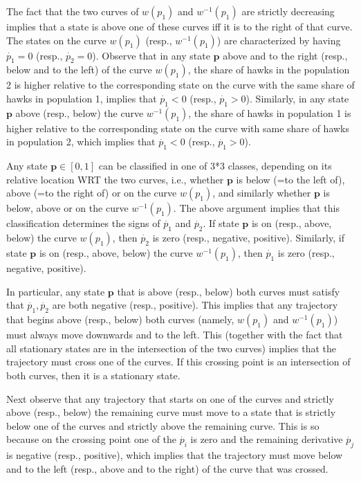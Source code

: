 \documentclass[12pt]{article}
\numberwithin{equation}{section}
\numberwithin{figure}{section}
\theoremstyle{definition}
\theoremstyle{plain}
\theoremstyle{plain}
\theoremstyle{plain}
\theoremstyle{remark}
\theoremstyle{plain}
\theoremstyle{plain}
\begin{document}
The fact that the two curves of $w(p_1)$ and $w^{-1}(p_1)$ are strictly decreasing implies that a state is above one of these curves iff it is to the right of that curve. The states on the curve $w(p_1)$ (resp., $w^{-1}(p_1)$) are characterized by having $\dot{p_1}=0$ (resp., $\dot{p_2}=0$). Observe that in any state $\textbf{p}$ above and to the right (resp., below and to the left) of the curve $w(p_1)$, the share of hawks in the population 2 is higher relative to the corresponding state on the curve with the same share of hawks in population 1, implies that $\dot{p_1}<0$ (resp., $\dot{p_1}>0$). Similarly, in any state $\textbf{p}$ above (resp., below) the curve $w^{-1}(p_1)$, the  share of hawks in population 1 is higher relative to the corresponding state on the curve with same share of hawks in population 2, which implies that $\dot{p_1}<0$ (resp., $\dot{p_1}>0$).

Any state $\textbf{p}\in[0,1]$ can be classified in one of 3*3 classes, depending on its relative location WRT the two curves, i.e., whether $\textbf{p}$ is below (=to the left of), above (=to the right of) or on the curve $w(p_1)$, and similarly whether $\textbf{p}$ is below, above or on the curve $w^{-1}(p_1)$. 
The above argument implies that this classification determines the signs of $\dot {p_1}$ and $\dot {p_2}$. If state $\textbf{p}$ is on (resp., above, below) the curve $w(p_1)$, then $\dot {p_2}$ is zero (resp., negative, positive). Similarly, if state $\textbf{p}$ is on (resp., above, below) the curve $w^{-1}(p_1)$, then $\dot {p_1}$ is zero (resp., negative, positive).

In particular, any state  $\textbf{p}$ that is above (resp., below) both curves must satisfy that $\dot {p_1},\dot {p_2}$ are both negative (resp., positive). This implies that any trajectory that begins  above (resp., below) both curves (namely, $w(p_1)$ and $w^{-1}(p_1)$) must always move downwards and to the left. This (together with the fact that all stationary states are in the intersection of the two curves) implies  that the trajectory must cross one of the curves. If this crossing point is an intersection of both curves, then it is a stationary state.

Next observe that any trajectory that starts on one of the curves and strictly above (resp., below) the remaining curve must move to a state that is strictly below one of the curves and strictly above the remaining curve. This is so because on the crossing point one of the $\dot {p_i}$ is zero and the remaining derivative $\dot{p_j}$ is negative (resp., positive), which implies that the trajectory must move below and to the left (resp., above and to the right) of the curve that was crossed.
\end{document}
